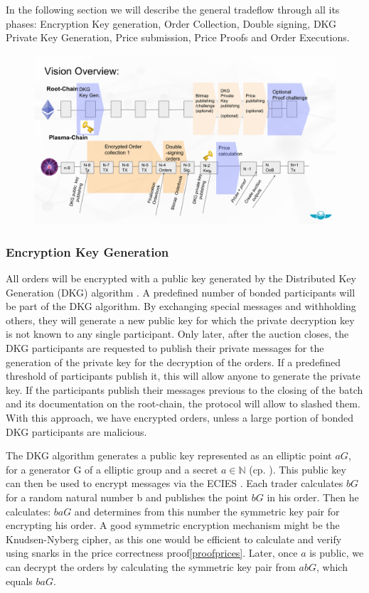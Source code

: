 \documentclass[11pt,parskip=full]{scrartcl}%
\begin{document}
In the following section we will describe the general tradeflow through all its phases: Encryption Key generation, Order Collection, Double signing, DKG Private Key Generation, Price submission, Price Proofs and Order Executions.

\begin{figure}
\centering
\includegraphics[width=\textwidth]{overview_tradeflow.png}
\end{figure}



\subsubsection{Encryption Key Generation}
All orders will be encrypted with a public key generated by the Distributed Key Generation (DKG) algorithm \cite{DKG}. 
A predefined number of bonded participants will be part of the DKG algorithm. 
By exchanging special messages and withholding others, they will generate a new public key for which the private decryption key is not known to any single participant. 
Only later, after the auction closes, the DKG participants are requested to publish their private messages for the generation of the private key for the decryption of the orders.
If a predefined threshold of participants publish it, this will allow anyone to generate the private key. 
If the participants publish their messages previous to the closing of the batch and its documentation on the root-chain, the protocol will allow to slashed them. 
With this approach, we have encrypted orders, unless a large portion of bonded DKG participants are malicious. 

The DKG algorithm generates a public key represented as an elliptic point $aG\label{public key}$, for a generator G of a elliptic group and a secret $a\in \mathbb{N}$ (cp. \cite{DKG}). 
This public key can then be used to encrypt messages via the ECIES \cite{ECIES}. 
Each trader calculates $bG \label{salt}$ for a random natural number b and publishes the point $bG$  in his order. 
Then he calculates: $baG$ and determines from this number the symmetric key pair for encrypting his order. 
A good symmetric encryption mechanism might be the Knudsen-Nyberg cipher\cite{cipher}, as this one would be efficient to calculate and verify using snarks in the price correctness proof\ref{proofprices}.
Later, once $a$ is public, we can decrypt the orders by calculating the symmetric key pair from $abG$, which equals $baG$. 
\end{document}
